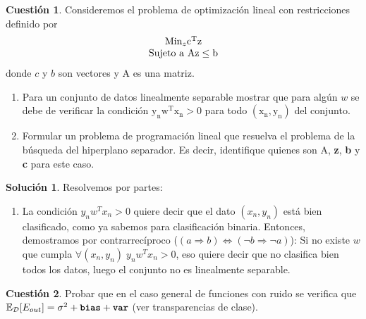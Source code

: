 \documentclass[a4paper, 11pt]{article}
\theoremstyle{definition}
\newtheorem{cuestion}{Cuestión}
\newtheorem*{solucion}{Solución}
\begin{document}
  \begin{cuestion}
    Consideremos el problema de optimización lineal con restricciones definido por
    \[
    \begin{array}{c}
    \text{Min}_{z} \mathrm{c^Tz} \\
    \hbox{Sujeto a } \mathrm{Az \leq b}
    \end{array}
    \]
    donde $c$ y $b$ son vectores y A es una matriz.

         \begin{enumerate}
            \item Para un conjunto de datos linealmente separable mostrar que para algún $w$ se debe de verificar la condición  $\mathrm{y_nw^Tx_n>0 }$ para todo $\mathrm{(x_n,y_n)}$ del conjunto.
            \item Formular un problema de programación lineal que resuelva el problema de la búsqueda del hiperplano separador. Es decir, identifique quienes son A, \textbf{z}, \textbf{b} y \textbf{c} para este caso.
        \end{enumerate}
  \end{cuestion}

  \begin{solucion}
    Resolvemos por partes:
    \begin{enumerate}
      \item La condición $y_nw^Tx_n>0$ quiere decir que el dato $(x_n,y_n)$ está bien clasificado, como ya sabemos para clasificación binaria. Entonces, demostramos por contrarrecíproco ($ \left( a \Rightarrow b \right) \Leftrightarrow \left( \neg b \Rightarrow \neg a \right) $): Si no existe $w$ que cumpla $\forall (x_n,y_n) \; y_nw^Tx_n>0$, eso quiere decir que no clasifica bien todos los datos, luego el conjunto no es linealmente separable.
    \end{enumerate}
  \end{solucion}

  \begin{cuestion}
    Probar que en el caso general de funciones con ruido se verifica que $\mathbb{E}_{\mathcal{D}}[E_{out}]= \sigma^2+\texttt{\textbf{bias}}+\texttt{\textbf{var}}$ (ver transparencias de clase).

  \end{cuestion}
\end{document}
